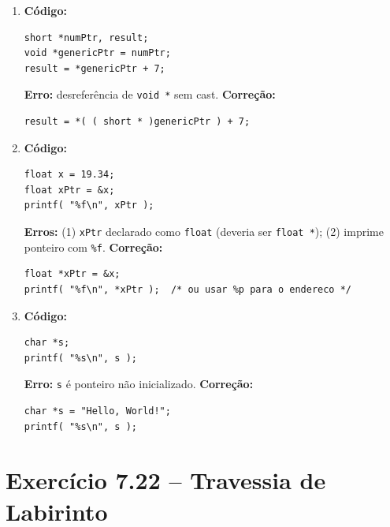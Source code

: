 \documentclass[12pt,a4paper]{article}
\begin{document}
\begin{respostabox}
\begin{enumerate}[label=\textbf{\alph*)}]
\item \textbf{Código:}
\begin{lstlisting}
short *numPtr, result;
void *genericPtr = numPtr;
result = *genericPtr + 7;
\end{lstlisting}
\textbf{Erro:} desreferência de \texttt{void *} sem cast.
\textbf{Correção:}
\begin{lstlisting}
result = *( ( short * )genericPtr ) + 7;
\end{lstlisting}

\item \textbf{Código:}
\begin{lstlisting}
float x = 19.34;
float xPtr = &x;
printf( "%f\n", xPtr );
\end{lstlisting}
\textbf{Erros:} (1) \texttt{xPtr} declarado como \texttt{float} (deveria ser \texttt{float *});
(2) imprime ponteiro com \texttt{\%f}.
\textbf{Correção:}
\begin{lstlisting}
float *xPtr = &x;
printf( "%f\n", *xPtr );  /* ou usar %p para o endereco */
\end{lstlisting}

\item \textbf{Código:}
\begin{lstlisting}
char *s;
printf( "%s\n", s );
\end{lstlisting}
\textbf{Erro:} \texttt{s} é ponteiro não inicializado.
\textbf{Correção:}
\begin{lstlisting}
char *s = "Hello, World!";
printf( "%s\n", s );
\end{lstlisting}
\end{enumerate}
\end{respostabox}

\newpage

\section{Exercício 7.22 -- Travessia de Labirinto}
\end{document}
